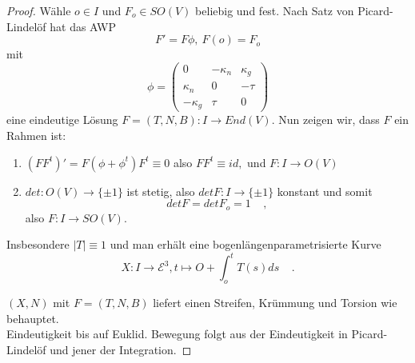 \documentclass[a4paper,oneside,11pt,DIV=12,parskip=half]{scrartcl}
\newcommand{\E}{\mathcal E}
\newenvironment{lemma, definition}{\textbf{Lemma und Definition.} ~~~~}{}
\newenvironment{note, example}{\textbf{Bemerkung und Beispiel.} ~~~~}{}
\newenvironment{note, definition}{\textbf{Bemerkung und Definition.} ~~~~}{}
\begin{document}
\begin{proof}
	
	Wähle $o \in I$ und $F_o \in SO(V)$ beliebig und fest.
	Nach Satz von Picard-Lindelöf hat das AWP 
		\[ F' = F\phi, ~ F(o)= F_o \] mit 
	\[ \phi =\begin{pmatrix}
		0 & -\kappa_n & \kappa_g \\
		\kappa_n & 0 & -\tau \\
		-\kappa_g & \tau & 0
	\end{pmatrix}\]
	eine eindeutige Lösung $F = (T,N,B) : I \rightarrow End(V)$.
	Nun zeigen wir, dass $F$ ein Rahmen ist:
	\begin{enumerate}
		\item $(FF^t)' = F( \phi  + \phi^t) F^t \equiv 0 $ also $FF^t \equiv id,$ und $F:I \rightarrow O(V)$
		\item $det: O(V) \rightarrow \{\pm1\}$ ist stetig, also $det F: I \rightarrow \{ \pm 1 \}$ konstant und somit $$det F = det F_o = 1 ~~~~~,$$ also $F: I \rightarrow SO(V).$
	\end{enumerate}
	
	Insbesondere $|T| \equiv 1$ und man erhält eine bogenlängenparametrisierte Kurve
		\[X: I \rightarrow \E^3, t \mapsto O + \int_{o}^{t} T(s) ds ~~~~~. \]
		
	$(X,N)$ mit $F=(T,N,B)$ liefert einen Streifen, Krümmung und Torsion wie behauptet.\\
	Eindeutigkeit bis auf Euklid. Bewegung folgt aus der Eindeutigkeit in Picard-Lindelöf und jener der Integration.
\end{proof}
\end{document}
